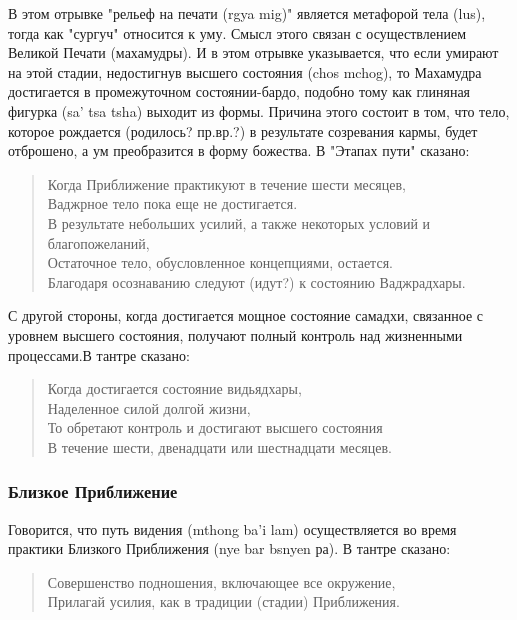 В этом отрывке "рельеф на печати (rgya mig)" является метафорой тела (lus), тогда как
"сургуч" относится к уму. Смысл этого связан с осуществлением Великой Печати
(махамудры). И в этом отрывке указывается, что если умирают на этой стадии, недостигнув
высшего состояния (chos mchog), то Махамудра достигается в промежуточном состоянии-бардо,
подобно тому как глиняная фигурка (sa' tsa tsha) выходит из формы. Причина этого
состоит в том, что тело, которое рождается (родилось? пр.вр.?) в результате созревания
кармы, будет отброшено, а ум преобразится в форму божества. В "Этапах пути" сказано:

\begin{verse}
Когда Приближение практикуют в течение шести месяцев, \\
Ваджрное тело пока еще не достигается.\\
В результате небольших усилий, а также некоторых условий и благопожеланий,\\
Остаточное тело, обусловленное концепциями, остается.\\
Благодаря осознаванию следуют (идут?) к состоянию Ваджрадхары.
\end{verse}

С другой стороны, когда достигается мощное состояние самадхи, связанное с уровнем
высшего состояния, получают полный контроль над жизненными процессами.В тантре сказано:

\begin{verse}
Когда достигается состояние видьядхары,\\
Наделенное силой долгой жизни,\\
То обретают контроль и достигают высшего состояния\\
В течение шести, двенадцати или шестнадцати месяцев.
\end{verse}

\subsubsection{Близкое Приближение}

Говорится, что путь видения (mthong ba'i lam) осуществляется во время практики
Близкого Приближения (nye bar bsnyen ра). В тантре сказано:

\begin{verse}
Совершенство подношения, включающее все окружение,\\
Прилагай усилия, как в традиции (стадии) Приближения.
\end{verse}

